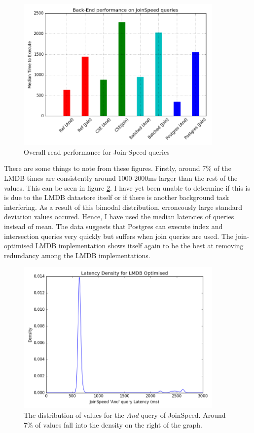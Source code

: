 \documentclass[12pt,a4paper,twoside,openright]{report}
\newcommand\mathName[1]{\textit{#1}}
\begin{document}
\begin{figure}[ht]
\centering
  \includegraphics[width=0.9\textwidth]{scripts/joinspeedComp.png}
  \caption{Overall read performance for Join-Speed queries}
  \label{fig:JoinSpeedResults}
\end{figure}
There are some things to note from these figures. Firstly, around 7\% of the LMDB times are consistently around 1000-2000ms larger than the rest of the values. This can be seen in figure \ref{fig:LatencyDensity}. I have yet been unable to determine if this is is due to the LMDB datastore itself or if there is another background task interfering. As a result of this bimodal distribution, erroneously large standard deviation values occured. Hence, I have used the median latencies of queries instead of mean. The data suggests that Postgres can execute index and intersection queries very quickly but suffers when join queries are used. The join-optimised LMDB implementation shows itself again to be the best at removing redundancy among the LMDB implementations.

\begin{figure}[ht]
\centering
  \includegraphics[width=0.9\textwidth]{scripts/LatencyDensity.png}
  \caption{The distribution of values for the \mathName{And} query of JoinSpeed. Around 7\% of values fall into the density on the right of the graph. }
  \label{fig:LatencyDensity}
\end{figure}
\end{document}
